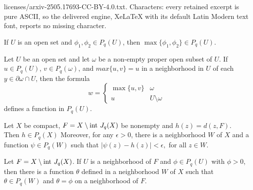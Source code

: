 \documentclass[10pt,a4paper]{amsart}
\begin{document}
licenses/arxiv-2505.17693-CC-BY-4.0.txt. Characters: every retained excerpt is pure ASCII, so the delivered engine, XeLaTeX with its default Latin Modern text font, reports no missing character.
\begin{lem}\label{closed under maximums}
    If $U$ is an open set and $\phi_1, \phi_2 \in P_q(U)$, then $\max\{\phi_1, \phi_2\} \in P_q(U)$. 
\end{lem}

\begin{lem}\label{gluing lemma}
Let $U$ be an open set and let $\omega$ be a non-empty proper open subset of $U$.  If $u \in P_q(U)$, $v \in P_q(\omega)$, and $max\{u, v\} = u$ in a neighborhood in $U$ of each $y \in \partial \omega \cap U$, then the formula
$$
w = \begin{cases}
    \max\{u, v\} & \omega
    \\
    u & U\setminus\omega
\end{cases}
$$
defines a function in $P_q(U)$.
 \end{lem}

\begin{lem}\label{distance function is Pq}
Let $X$ be compact, $F = X \setminus \hbox{int }J_q(X)$ be nonempty and $h(z) = d(z, F)$.  Then $h \in P_q(X)$  Moreover, for any $\epsilon > 0$, there is a neighborhood $W$ of $X$ and a function $\psi \in P_q(W)$ such that 
$
|\psi(z) - h(z)| < \epsilon,
$
for all $z \in W$.

\end{lem}

\begin{lem}\label{break up of the longer lemma into a second part}
    Let $F = X \setminus \hbox{int }J_q(X)$.  If $U$ is a neighborhood of $F$ and $\phi \in P_q(U)$ with $\phi > 0$, then there is a function $\theta$ defined in a neighborhood $W$ of $X$ such that $\theta \in P_q(W)$ and $\theta = \phi$ on a neighborhood of $F$.
\end{lem}
\end{document}
